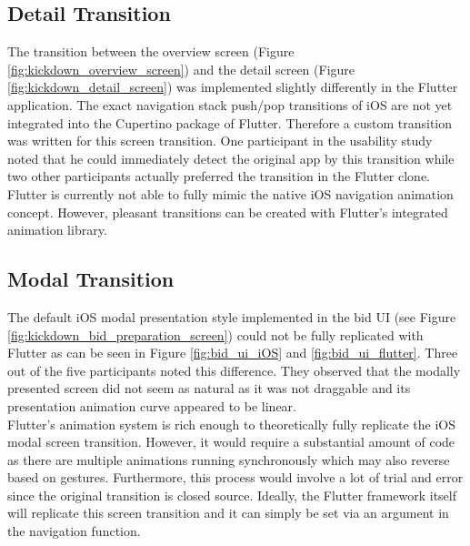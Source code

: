 \subsection{Detail Transition}
The transition between the overview screen (Figure \ref{fig:kickdown_overview_screen}) and the detail screen (Figure \ref{fig:kickdown_detail_screen}) was implemented slightly differently in the Flutter application.
The exact navigation stack push/pop transitions of iOS are not yet integrated into the Cupertino package of Flutter. Therefore a custom transition was written for this screen transition.
One participant in the usability study noted that he could immediately detect the original app by this transition while two other participants actually preferred the transition in the Flutter clone.
Flutter is currently not able to fully mimic the native iOS navigation animation concept. However, pleasant transitions can be created with Flutter's integrated animation library.

\subsection{Modal Transition}
The default iOS modal presentation style implemented in the bid UI (see Figure \ref{fig:kickdown_bid_preparation_screen}) could not be fully replicated with Flutter as can be seen in Figure \ref{fig:bid_ui_iOS} and \ref{fig:bid_ui_flutter}.
Three out of the five participants noted this difference. 
They observed that the modally presented screen did not seem as natural as it was not draggable and its presentation animation curve appeared to be linear.\\
Flutter's animation system is rich enough to theoretically fully replicate the iOS modal screen transition. However, it would require a substantial amount of code as there are multiple animations 
running synchronously which may also reverse based on gestures. Furthermore, this process would involve a lot of trial and error since the original transition is closed source.
Ideally, the Flutter framework itself will replicate this screen transition and it can simply be set via an argument in the navigation function.

